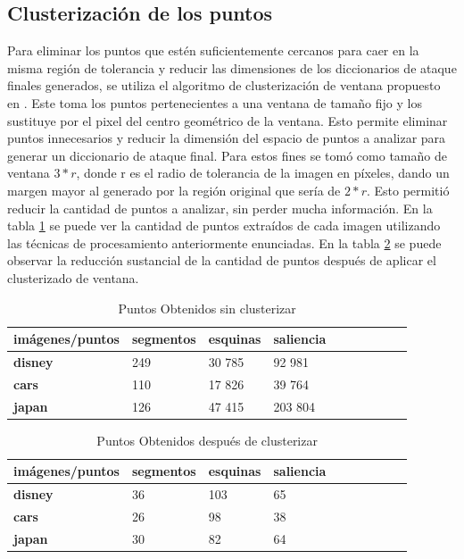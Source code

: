 \subsection{Clusterizaci\'on de los puntos }
Para eliminar los puntos que est\'en suficientemente cercanos para caer en la misma regi\'on de tolerancia y reducir las dimensiones de los diccionarios de ataque finales generados, se utiliza el algoritmo de clusterizaci\'on de ventana propuesto en \cite{van2010purely}. Este toma los puntos pertenecientes a una ventana de tama\~no fijo y los sustituye por el pixel del centro geom\'etrico de la ventana. Esto permite eliminar puntos innecesarios y reducir la dimensi\'on del espacio de puntos a analizar para generar un diccionario de ataque final. Para estos fines se tom\'o como tama\~no de ventana $3*r$, donde r es el radio de tolerancia de la imagen en p\'ixeles, dando un margen mayor al generado por la regi\'on original que ser\'ia de $2*r$. Esto permiti\'o reducir la cantidad de puntos a analizar, sin perder mucha informaci\'on. En la tabla \ref{points:void} se puede ver la cantidad de puntos extra\'idos de cada imagen utilizando las t\'ecnicas de procesamiento anteriormente enunciadas. En la tabla \ref{points:cluster} se puede observar la reducci\'on sustancial de la cantidad de puntos despu\'es de aplicar el clusterizado de ventana.
\begin{table}[H]
	\centering
	\caption{Puntos Obtenidos sin clusterizar}
	\label{points:void}
	\begin{tabular}{|l|l|l|l|l|l|l|l|l|l|}
		\hline
		\textbf{im\'agenes/puntos} & \textbf{segmentos } & \textbf{esquinas} & \textbf{saliencia}
		\\ \hline
		\textbf{disney} & 249 & 30 785 & 92 981 \\ \hline
		\textbf{cars} & 110 & 17 826 & 39 764 \\ \hline
		\textbf{japan} & 126 & 47 415 & 203 804  \\ \hline
	
	\end{tabular}
\end{table}

\begin{table}[H]
	\centering
	\caption{Puntos Obtenidos despu\'es de clusterizar}
		\label{points:cluster}
	\begin{tabular}{|l|l|l|l|l|l|l|l|l|l|}
		\hline
		\textbf{im\'agenes/puntos} & \textbf{segmentos} & \textbf{esquinas} & \textbf{saliencia }  \\ \hline
		\textbf{disney} & 36 & 103 & 65  \\ \hline
		\textbf{cars} & 26 & 98 & 38  \\ \hline
		\textbf{japan} & 30 & 82 & 64 \\ \hline
	\end{tabular}
\end{table}

